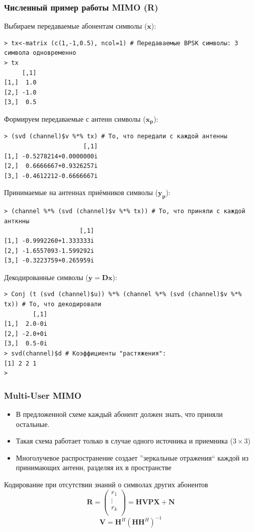 \documentclass[utf8]{beamer}
\begin{document}
\begin{frame}[fragile]
\frametitle{Численный пример работы MIMO (R)}
{
Выбираем передаваемые абонентам символы ($\mathbf{x}$):
\tiny
\begin{verbatim}
> tx<-matrix (c(1,-1,0.5), ncol=1) # Передаваемые BPSK символы: 3 символа одновременно
> tx
     [,1]
[1,]  1.0
[2,] -1.0
[3,]  0.5
\end{verbatim}
}
Формируем передаваемые с антенн символы ($\mathbf{x_p}$):
{
\tiny
\begin{verbatim}
> (svd (channel)$v %*% tx) # То, что передали с каждой антенны
                      [,1]
[1,] -0.5278214+0.0000000i
[2,]  0.6666667+0.9326257i
[3,] -0.4612212-0.6666667i
\end{verbatim}
}
Принимаемые на антеннах приёмников символы ($\mathbf{y_p}$):
{
\tiny
\begin{verbatim}
> (channel %*% (svd (channel)$v %*% tx)) # То, что приняли с каждой анткнны
                     [,1]
[1,] -0.9992260+1.333333i
[2,] -1.6557093-1.599292i
[3,] -0.3223759+0.265959i
\end{verbatim}
}
Декодированные символы ($\mathbf{y} = \mathbf{D} \mathbf{x}$): 
{
\tiny
\begin{verbatim}
> Conj (t (svd (channel)$u)) %*% (channel %*% (svd (channel)$v %*% tx)) # То, что декодировали
        [,1]
[1,]  2.0-0i
[2,] -2.0+0i
[3,]  0.5-0i
> svd(channel)$d # Коэффициенты "растяжения":
[1] 2 2 1
> 
\end{verbatim}
}
\end{frame}
\begin{frame}
\frametitle {Multi-User MIMO}
\begin{itemize}
  \item В предложенной схеме каждый абонент должен знать, что приняли
  остальные.
  \item Такая схема работает только в случае одного источника и приемника ($3\times3$)
  \item  Многолучевое распространение создает ''зеркальные отражения``
  каждой из принимающих антенн, разделяя их в пространстве
\end{itemize}
\begin{block}{Кодирование при отсутствии знаний о символах других абонентов}
$$
\mathbf{R} =
\left(
\begin{array}{c}
r_1 \\ \vdots \\ r_k \\
\end{array}
\right) = 
\mathbf {HVPX} + \mathbf{N}
$$
$$
\mathbf{V} = \mathbf{H}^H
(\mathbf{H}\mathbf{H}^H)^{-1}
$$
\end{block}
\end{frame}
\end{document}
